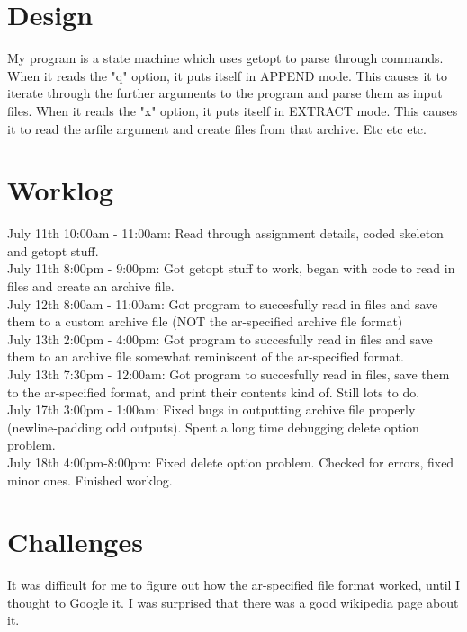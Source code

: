 \documentclass[11pt]{article}
\begin{document}
\section{Design}
My program is a state machine which uses getopt to parse through commands. When it reads the "q" option, it puts itself in APPEND mode. This causes it to iterate through the further arguments to the program and parse them as input files. When it reads the "x" option, it puts itself in EXTRACT mode. This causes it to read the arfile argument and create files from that archive. Etc etc etc. \\

\section{Worklog}
July 11th 10:00am - 11:00am: Read through assignment details, coded skeleton and getopt stuff. \\

July 11th 8:00pm - 9:00pm: Got getopt stuff to work, began with code to read in files and create an archive file. \\

July 12th 8:00am - 11:00am: Got program to succesfully read in files and save them to a custom archive file (NOT the ar-specified archive file format) \\

July 13th 2:00pm - 4:00pm: Got program to succesfully read in files and save them to an archive file somewhat reminiscent of the ar-specified format. \\

July 13th 7:30pm - 12:00am: Got program to succesfully read in files, save them to the ar-specified format, and print their contents kind of. Still lots to do. \\

July 17th 3:00pm - 1:00am: Fixed bugs in outputting archive file properly (newline-padding odd outputs). Spent a long time debugging delete option problem. \\

July 18th 4:00pm-8:00pm: Fixed delete option problem. Checked for errors, fixed minor ones. Finished worklog. \\

\section{Challenges}
It was difficult for me to figure out how the ar-specified file format worked, until I thought to Google it. I was surprised that there was a good wikipedia page about it. \\
\end{document}
